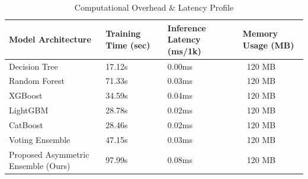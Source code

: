 \begin{table}
\caption{Computational Overhead & Latency Profile}
\label{tab:comp_cost}
\begin{tabular}{llll}
\toprule
Model Architecture & Training Time (sec) & Inference Latency (ms/1k) & Memory Usage (MB) \\
\midrule
Decision Tree & 17.12s & 0.00ms & ~120 MB \\
Random Forest & 71.33s & 0.03ms & ~120 MB \\
XGBoost & 34.59s & 0.04ms & ~120 MB \\
LightGBM & 28.78s & 0.02ms & ~120 MB \\
CatBoost & 28.46s & 0.02ms & ~120 MB \\
Voting Ensemble & 47.15s & 0.03ms & ~120 MB \\
Proposed Asymmetric Ensemble (Ours) & 97.99s & 0.08ms & ~120 MB \\
\bottomrule
\end{tabular}
\end{table}
